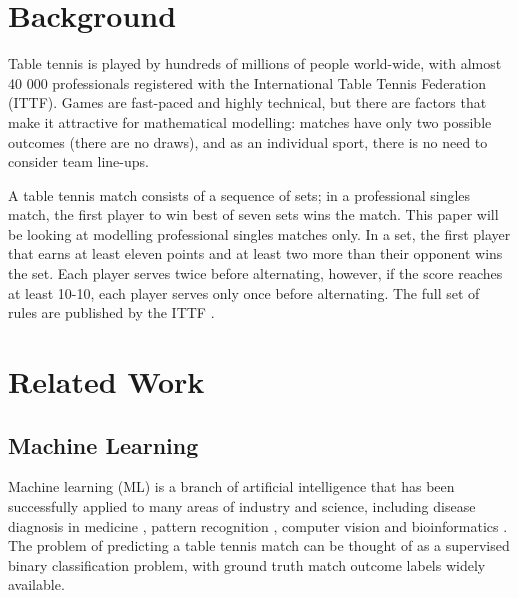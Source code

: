 \section{Background}
Table tennis is played by hundreds of millions of people world-wide, with almost 40 000 professionals registered with the International Table Tennis Federation (ITTF). Games are fast-paced and highly technical, but there are  factors that make it attractive for mathematical modelling: matches have only two possible outcomes (there are no draws), and as an individual sport, there is no need to consider team line-ups.

A table tennis match consists of a sequence of sets; in a professional singles match, the first player to win best of seven sets wins the match. 
This paper will be looking at modelling professional singles matches only.
In a set, the first player that earns at least eleven points and at least two more than their opponent wins the set. Each player serves twice before alternating, however, if the score reaches at least 10-10, each player serves only once before alternating.  
The full set of rules are published by the ITTF \cite{ITTF}.

\section{Related Work} \label{sec:relatedwork}
\subsection{Machine Learning}
Machine learning (ML) is a branch of artificial intelligence that has been successfully applied to many areas of industry and science, including disease diagnosis in medicine \cite{kourou2015machine}, pattern recognition \cite{weiss1989empirical}, computer vision \cite{khan2020machine} and bioinformatics \cite{larranaga2006machine}.
The problem of predicting a table tennis match can be thought of as a supervised binary classification problem, with ground truth match outcome labels widely available. %



